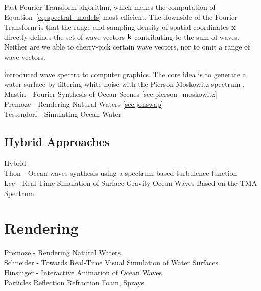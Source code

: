 Fast Fourier Transform algorithm, which makes the computation of
Equation~\ref{eq:spectral_models} most efficient. The downside of the Fourier
Transform is that the range and sampling density of spatial coordinates
$\mathbf{x}$ directly defines the set of wave vectors $\mathbf{k}$ contributing to
the sum of waves. Neither are we able to cherry-pick certain wave vectors, nor
to omit a range of wave vectors.


\cite{Mastin:1987} introduced wave spectra to computer graphics. The core idea
is to generate a water surface by filtering white noise with the
Pierson-Moskowitz spectrum \citep{article:PiersonMoskowitz1964}.
Mastin  - Fourier Synthesis of Ocean Scenes \cite{Mastin:1987} \cite{article:PiersonMoskowitz1964} \ref{sec:pierson_moskowitz}\\
Premoze - Rendering Natural Waters \cite{Premoze:2000} \cite{article:Hasselman1973} \ref{sec:jonswap}\\
Tessendorf - Simulating Ocean Water \cite{course:simulatingocean}

\subsection{Hybrid Approaches}
Hybrid\\
Thon - Ocean waves synthesis using a spectrum based turbulence function \cite{thon:2000}\\
Lee - Real-Time Simulation of Surface Gravity Ocean Waves Based on the TMA Spectrum\cite{lee:2007}

\section{Rendering}
%
Premoze - Rendering Natural Waters \cite{Premoze:2000}\\
Schneider - Towards Real-Time Visual Simulation of Water Surfaces \cite{Schneider:2001}\\
Hinsinger - Interactive Animation of Ocean Waves \cite{Hinsinger:2002}\\
Particles
Reflection
Refraction
Foam, Sprays







